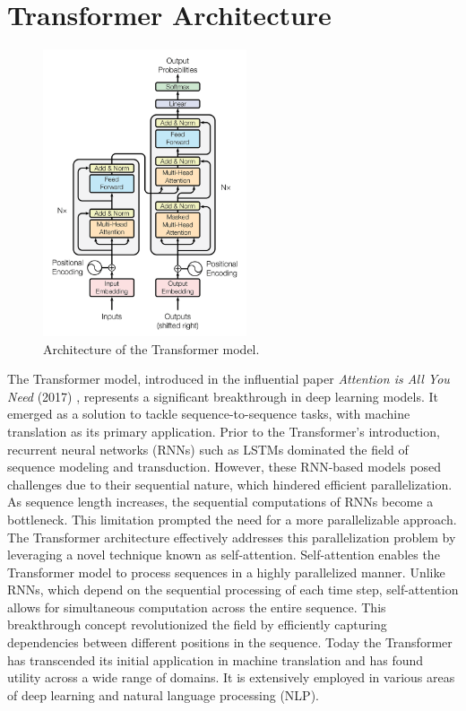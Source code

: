 \documentclass[a4paper,10pt]{report} %
\begin{document}
\section{Transformer Architecture}
\begin{figure}
  \centering
  \includegraphics[width=6cm]{img/transformer.png}
  \caption{Architecture of the Transformer model. \cite{VaswaniAttentionIsAll}}
  \label{fig:transformer}
\end{figure}
The Transformer model, introduced in the influential paper \textit{Attention is All You Need} (2017) \cite{VaswaniAttentionIsAll}, represents a significant breakthrough in deep learning models. It emerged as a solution to tackle sequence-to-sequence tasks, with machine translation as its primary application. Prior to the Transformer's introduction, recurrent neural networks (RNNs) such as LSTMs dominated the field of sequence modeling and transduction. However, these RNN-based models posed challenges due to their sequential nature, which hindered efficient parallelization. As sequence length increases, the sequential computations of RNNs become a bottleneck. This limitation prompted the need for a more parallelizable approach. The Transformer architecture effectively addresses this parallelization problem by leveraging a novel technique known as self-attention. Self-attention enables the Transformer model to process sequences in a highly parallelized manner. Unlike RNNs, which depend on the sequential processing of each time step, self-attention allows for simultaneous computation across the entire sequence. This breakthrough concept revolutionized the field by efficiently capturing dependencies between different positions in the sequence. \cite{VaswaniAttentionIsAll} Today the Transformer has transcended its initial application in machine translation and has found utility across a wide range of domains. It is extensively employed in various areas of deep learning and natural language processing (NLP). \cite{LinSurvey}
\end{document}

